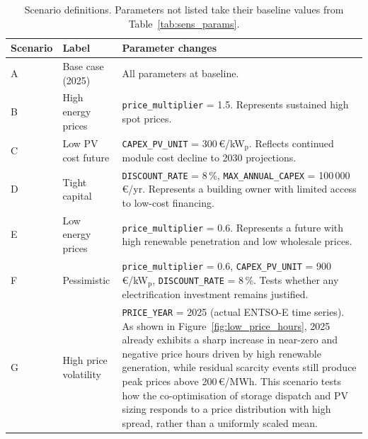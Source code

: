 \documentclass[11pt,a4paper]{report}
\begin{document}
\begin{table}[H]
\centering
\caption{Scenario definitions. Parameters not listed take their baseline values
         from Table~\ref{tab:sens_params}.}
\label{tab:scenarios}
\begin{tabular}{lp{3.5cm}p{7cm}}
\hline
\textbf{Scenario} & \textbf{Label} & \textbf{Parameter changes} \\
\hline
A & Base case (2025)
  & All parameters at baseline. \\
B & High energy prices
  & \texttt{price\_multiplier} = 1.5.
    Represents sustained high spot prices. \\
C & Low PV cost future
  & \texttt{CAPEX\_PV\_UNIT} = 300\,\euro/kW$_\mathrm{p}$.
    Reflects continued module cost decline to 2030 projections. \\
D & Tight capital
  & \texttt{DISCOUNT\_RATE} = 8\,\%,
    \texttt{MAX\_ANNUAL\_CAPEX} = 100\,000\,\euro/yr.
    Represents a building owner with limited access to low-cost financing. \\
E & Low energy prices
  & \texttt{price\_multiplier} = 0.6.
    Represents a future with high renewable penetration and low wholesale prices. \\
F & Pessimistic
  & \texttt{price\_multiplier} = 0.6,
    \texttt{CAPEX\_PV\_UNIT} = 900\,\euro/kW$_\mathrm{p}$,
    \texttt{DISCOUNT\_RATE} = 8\,\%.
    Tests whether any electrification investment remains justified. \\
G & High price volatility
  & \texttt{PRICE\_YEAR} = 2025 (actual ENTSO-E time series).
    As shown in Figure~\ref{fig:low_price_hours}, 2025 already exhibits
    a sharp increase in near-zero and negative price hours driven by
    high renewable generation, while residual scarcity events still
    produce peak prices above 200\,\euro/MWh.
    This scenario tests how the co-optimisation of storage dispatch and
    PV sizing responds to a price distribution with high spread, rather
    than a uniformly scaled mean. \\
\hline
\end{tabular}
\end{table}

\end{document}
